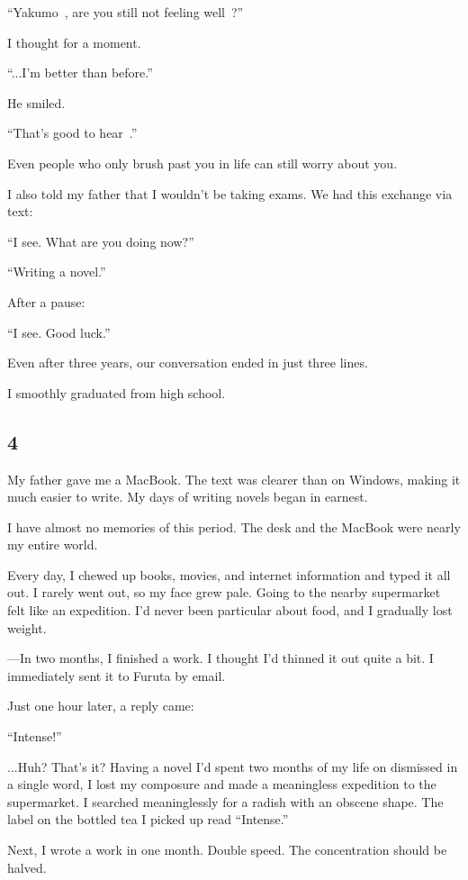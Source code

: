 \documentclass[
    a4paper,
    12pt,
    twoside,
    openany,
    UTF8,
    fontset=windows
]{ctexbook}
\begin{document}
``Yakumo~, are you still not feeling well~?''

I thought for a moment.

``...I'm better than before.''

He smiled.

``That's good to hear~.''

Even people who only brush past you in life can still worry about you.

I also told my father that I wouldn't be taking exams. We had this exchange via text:

``I see. What are you doing now?''

``Writing a novel.''

After a pause:

``I see. Good luck.''

Even after three years, our conversation ended in just three lines.

I smoothly graduated from high school.


\subsection*{4}

My father gave me a MacBook. The text was clearer than on Windows, making it much easier to write. My days of writing novels began in earnest.

I have almost no memories of this period. The desk and the MacBook were nearly my entire world.

Every day, I chewed up books, movies, and internet information and typed it all out. I rarely went out, so my face grew pale. Going to the nearby supermarket felt like an expedition. I'd never been particular about food, and I gradually lost weight.

---In two months, I finished a work. I thought I'd thinned it out quite a bit. I immediately sent it to Furuta by email.

Just one hour later, a reply came:

``Intense!''

...Huh? That's it? Having a novel I'd spent two months of my life on dismissed in a single word, I lost my composure and made a meaningless expedition to the supermarket. I searched meaninglessly for a radish with an obscene shape. The label on the bottled tea I picked up read ``Intense.''

Next, I wrote a work in one month. Double speed. The concentration should be halved.
\end{document}
